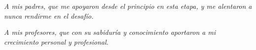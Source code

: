 
\begin{dedication}
\textit{A mis padres, que me apoyaron desde el principio en esta etapa, y me alentaron a nunca rendirme en el desafío.}

\textit{A mis profesores, que con su sabiduría y conocimiento aportaron a mi crecimiento personal y profesional.}

\end{dedication}